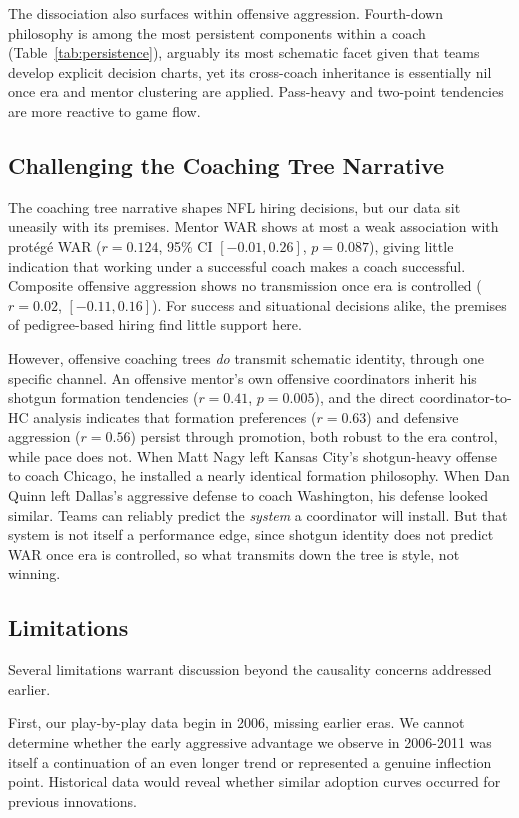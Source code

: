 \documentclass[USenglish]{article}
\theoremstyle{dgthm}
\theoremstyle{dgdef}
\begin{document}
The dissociation also surfaces within offensive aggression. Fourth-down philosophy is among the most persistent components within a coach (Table~\ref{tab:persistence}), arguably its most schematic facet given that teams develop explicit decision charts, yet its cross-coach inheritance is essentially nil once era and mentor clustering are applied. Pass-heavy and two-point tendencies are more reactive to game flow.

\subsection{Challenging the Coaching Tree Narrative}

The coaching tree narrative shapes NFL hiring decisions, but our data sit uneasily with its premises. Mentor WAR shows at most a weak association with prot\'{e}g\'{e} WAR ($r=0.124$, 95\% CI $[-0.01, 0.26]$, $p=0.087$), giving little indication that working under a successful coach makes a coach successful. Composite offensive aggression shows no transmission once era is controlled ($r=0.02$, $[-0.11, 0.16]$). For success and situational decisions alike, the premises of pedigree-based hiring find little support here.

However, offensive coaching trees \emph{do} transmit schematic identity, through one specific channel. An offensive mentor's own offensive coordinators inherit his shotgun formation tendencies ($r=0.41$, $p=0.005$), and the direct coordinator-to-HC analysis indicates that formation preferences ($r=0.63$) and defensive aggression ($r=0.56$) persist through promotion, both robust to the era control, while pace does not. When Matt Nagy left Kansas City's shotgun-heavy offense to coach Chicago, he installed a nearly identical formation philosophy. When Dan Quinn left Dallas's aggressive defense to coach Washington, his defense looked similar. Teams can reliably predict the \emph{system} a coordinator will install. But that system is not itself a performance edge, since shotgun identity does not predict WAR once era is controlled, so what transmits down the tree is style, not winning.

\subsection{Limitations}

Several limitations warrant discussion beyond the causality concerns addressed earlier.

First, our play-by-play data begin in 2006, missing earlier eras. We cannot determine whether the early aggressive advantage we observe in 2006-2011 was itself a continuation of an even longer trend or represented a genuine inflection point. Historical data would reveal whether similar adoption curves occurred for previous innovations.
\end{document}
